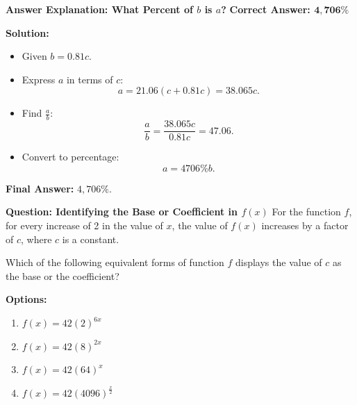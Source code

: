 \documentclass{beamer}
\begin{document}
\begin{frame}{\textbf{Answer Explanation: What Percent of \( b \) is \( a \)?}}
    \textbf{Correct Answer:  \textcolor{novelPurple}{\( \mathbf{4,706\%} \)}}  

    \vspace{0.3cm}
    \textbf{Solution:}
    \begin{itemize}
        \item Given \( b = 0.81c \).
        \item Express \( a \) in terms of \( c \):
        \[
        a = 21.06(c + 0.81c) = 38.065c.
        \]
        \item Find \( \frac{a}{b} \):
        \[
        \frac{a}{b} = \frac{38.065c}{0.81c} = 47.06.
        \]
        \item Convert to percentage:
        \[
        a = 4706\%b.
        \]
    \end{itemize}
    \textbf{Final Answer:} \( \boxed{4,706\%} \).
\end{frame}

\begin{frame}{\textbf{Question: Identifying the Base or Coefficient in \( f(x) \)}}
    For the function \( f \), for every increase of 2 in the value of \( x \),  
    the value of \( f(x) \) increases by a factor of \( c \), where \( c \) is a constant.  

    \vspace{0.3cm}
    Which of the following equivalent forms of function \( f \) displays the value of \( c \) as the base or the coefficient?

    \vspace{0.5cm}
    \textbf{Options:}
    \begin{enumerate}
        \item[A.] \( f(x) = 42(2)^{6x} \)
        \item[B.] \( f(x) = 42(8)^{2x} \)
        \item[C.] \( f(x) = 42(64)^x \)
        \item[D.] \( f(x) = 42(4096)^{\frac{x}{2}} \)
    \end{enumerate}
\end{frame}
\end{document}
